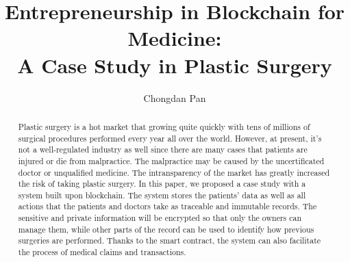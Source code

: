 \documentclass{article}
\title{Entrepreneurship in Blockchain for Medicine: \\A Case Study in Plastic Surgery}
\author{Chongdan Pan}
\begin{document}
\maketitle

\begin{abstract}
Plastic surgery is a hot market that growing quite quickly with tens of millions of surgical procedures performed every year all over the world. However, at present, it's not a well-regulated industry as well since there are many cases that patients are injured or die from malpractice. The malpractice may be caused by the uncertificated doctor or unqualified medicine. The intransparency of the market has greatly increased the risk of taking plastic surgery. In this paper, we proposed a case study with a system built upon blockchain. The system stores the patients' data as well as all actions that the patients and doctors take as traceable and immutable records. The sensitive and private information will be encrypted so that only the owners can manage them, while other parts of the record can be used to identify how previous surgeries are performed. Thanks to the smart contract, the system can also facilitate the process of medical claims and transactions.
\end{abstract}
\end{document}
